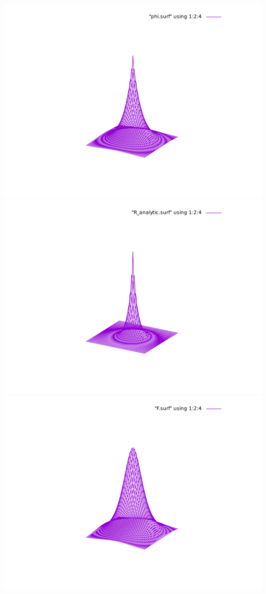 \begin{frame}
\includegraphics[scale=0.35, viewport = 175 90 430 400, clip]{figures/phi.pdf}
\includegraphics[scale=0.35, viewport = 175 90 430 400, clip]{figures/R.pdf}
\includegraphics[scale=0.35, viewport = 175 90 430 400, clip]{figures/F.pdf}\\

\end{frame}

